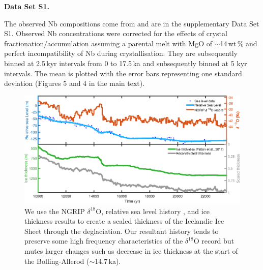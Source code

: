 \documentclass[draft,grl]{agutexSI2018}
\begin{document}
\begin{article}
\noindent\textbf{Data Set S1.}

The observed Nb compositions come from \citet{gee-etal-1998,sinton-etal-2005,eason-etal-2015} and are in the supplementary Data Set S1. Observed Nb concentrations were corrected for the effects of crystal fractionation/accumulation assuming a parental melt with MgO of $\sim$14\,wt\,\% and perfect incompatibility of Nb during crystallisation. They are subsequently binned at 2.5\,kyr intervals from 0 to 17.5\,ka and subsequently binned at 5 kyr intervals. The mean is plotted with the error bars representing one standard deviation (Figures 5 and 4 in the main text).

\newcommand{\newblock}{}


\end{article}
\clearpage


\begin{figure}
\includegraphics{../figures/version05/supp-figure-1.eps}
\caption{We use the NGRIP $\delta^{18}$O, relative sea level history \citep{spratt-2016}, and ice thickness results \citep{lambeck-etal-2014} to create a scaled thickness of the Icelandic Ice Sheet through the deglaciation. Our resultant history tends to preserve some high frequency characteristics of the $\delta^{18}$O record but mutes larger changes such as decrease in ice thickness at the start of the B{\/o}lling-Aller{\/o}d ($\sim$14.7\,ka).}
\label{fg:S1}
\end{figure}
\end{document}
